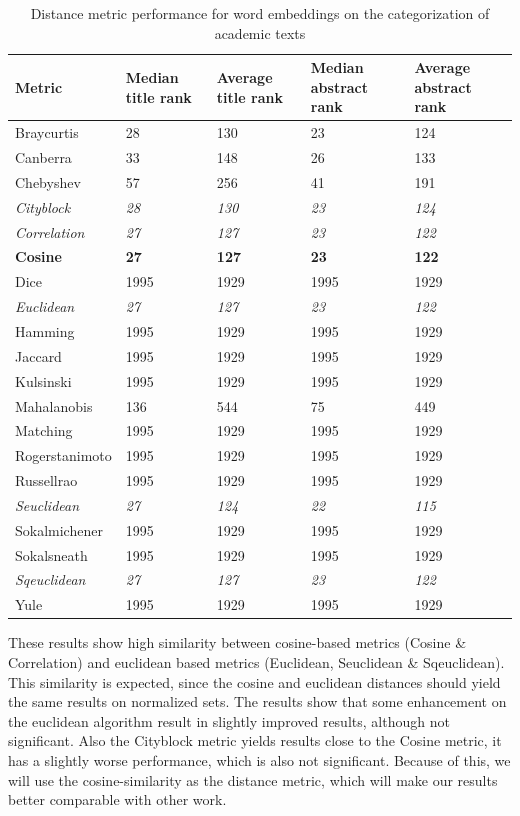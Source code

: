 \documentclass[../../Thesis.tex]{subfiles}
\begin{document}
\begin{table}[hbt]
\begin{tabular}{|l|l|l|l|l|}
\hline
Metric\footnotemark & Median title rank & Average title rank & Median abstract rank & Average abstract rank  \\
\hline
Braycurtis & 28 & 130 & 23 & 124  \\
\hline
Canberra & 33 & 148 & 26 & 133  \\
\hline
Chebyshev & 57 & 256 & 41 & 191  \\
\hline
\textit{Cityblock} & \textit{28} & \textit{130} & \textit{23} & \textit{124}  \\
\hline
\textit{Correlation} & \textit{27} & \textit{127} & \textit{23} & \textit{122}  \\
\hline
\textbf{Cosine} & \textbf{27} & \textbf{127} & \textbf{23} & \textbf{122}  \\
\hline
Dice & 1995 & 1929 & 1995 & 1929  \\
\hline
\textit{Euclidean} & \textit{27} & \textit{127} & \textit{23} & \textit{122}  \\
\hline
Hamming & 1995 & 1929 & 1995 & 1929  \\
\hline
Jaccard & 1995 & 1929 & 1995 & 1929  \\
\hline
Kulsinski & 1995 & 1929 & 1995 & 1929  \\
\hline
Mahalanobis & 136 & 544 & 75 & 449  \\
\hline
Matching & 1995 & 1929 & 1995 & 1929  \\
\hline
Rogerstanimoto & 1995 & 1929 & 1995 & 1929  \\
\hline
Russellrao & 1995 & 1929 & 1995 & 1929  \\
\hline
\textit{Seuclidean} & \textit{27} & \textit{124} & \textit{22} & \textit{115}  \\
\hline
Sokalmichener & 1995 & 1929 & 1995 & 1929  \\
\hline
Sokalsneath & 1995 & 1929 & 1995 & 1929  \\
\hline
\textit{Sqeuclidean} & \textit{27} & \textit{127} & \textit{23} & \textit{122}  \\
\hline
Yule & 1995 & 1929 & 1995 & 1929  \\
\hline
\end{tabular}
\caption{Distance metric performance for word embeddings on the categorization of academic texts}\label{table:distanceMetrics}
\end{table}
These results show high similarity between cosine-based metrics (Cosine \& Correlation) and euclidean based metrics (Euclidean, Seuclidean \& Sqeuclidean). This similarity is expected, since the cosine and euclidean distances should yield the same results on normalized sets. The results show that some enhancement on the euclidean algorithm result in slightly improved results, although not significant. Also the Cityblock metric yields results close to the Cosine metric, it has a slightly worse performance, which is also not significant. Because of this, we will use the cosine-similarity as the distance metric, which will make our results better comparable with other work.
\end{document}
